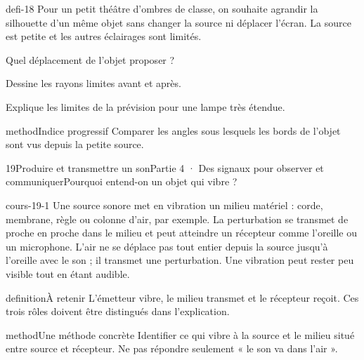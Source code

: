 \documentclass[12pt,twoside,openany]{book}
\begin{document}
\label{defi-ex-18}
\begin{pcFiche}{defi-18}
Pour un petit théâtre d’ombres de classe, on souhaite agrandir la silhouette d’un même objet sans changer la source ni déplacer l’écran. La source est petite et les autres éclairages sont limités.\par
{}
\begin{questions}
\item Quel déplacement de l’objet proposer ?
\item Dessine les rayons limites avant et après.
\item Explique les limites de la prévision pour une lampe très étendue.
\end{questions}
\begin{pcEncadre}{method}{Indice progressif}
Comparer les angles sous lesquels les bords de l’objet sont vus depuis la petite source.\par
\end{pcEncadre}
\end{pcFiche}
\clearpage\pagestyle{otMain}
\begin{ouverture}[college4]{19}{Produire et transmettre un son}{Partie 4 · Des signaux pour observer et communiquer}{Pourquoi entend-on un objet qui vibre ?}
\end{ouverture}
\label{ch-19-cours-1}
\label{ess-19}
\begin{pcFiche}{cours-19-1}
Une source sonore met en vibration un milieu matériel : corde, membrane, règle ou colonne d’air, par exemple. La perturbation se transmet de proche en proche dans le milieu et peut atteindre un récepteur comme l’oreille ou un microphone. L’air ne se déplace pas tout entier depuis la source jusqu’à l’oreille avec le son ; il transmet une perturbation. Une vibration peut rester peu visible tout en étant audible.\par
{}
\begin{pcEncadre}{definition}{À retenir}
L’émetteur vibre, le milieu transmet et le récepteur reçoit. Ces trois rôles doivent être distingués dans l’explication.\par
\end{pcEncadre}
\begin{pcEncadre}{method}{Une méthode concrète}
Identifier ce qui vibre à la source et le milieu situé entre source et récepteur. Ne pas répondre seulement « le son va dans l’air ».\par
\end{pcEncadre}
\end{pcFiche}
\end{document}
